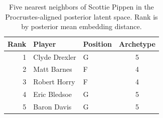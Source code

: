 \begin{table}[htbp]
  \centering\small
  \begin{tabular}{rllc}
    \toprule
    Rank & Player & Position & Archetype \\
    \midrule
    1 & Clyde Drexler & G & 5 \\
    2 & Matt Barnes & F & 4 \\
    3 & Robert Horry & F & 4 \\
    4 & Eric Bledsoe & G & 5 \\
    5 & Baron Davis & G & 5 \\
    \bottomrule
  \end{tabular}
  \caption{Five nearest neighbors of Scottie Pippen in the Procrustes-aligned posterior latent space. Rank is by posterior mean embedding distance.}
  \label{tab:Scottie_Pippen_neighbors}
\end{table}

